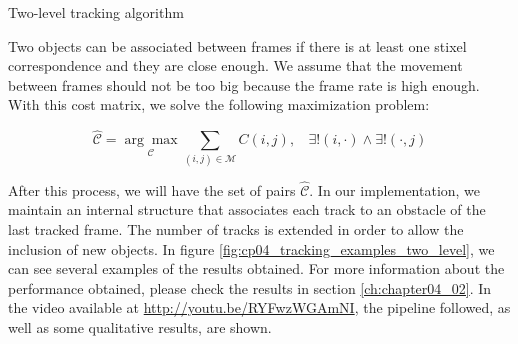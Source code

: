 \begin{algorithm}
\caption{Two-level tracking algorithm}
\label{alg:cp04_two_level_tracking}
\begin{algorithmic}
      \EndIf
    \EndFor
  \EndFor
\EndFunction
\end{algorithmic}
\end{algorithm}

Two objects can be associated between frames if there is at least one stixel correspondence and they are close enough. We assume that the movement between frames should not be too big because the frame rate is high enough. With this cost matrix, we solve the following maximization problem:

\begin{equation}\label{eq:cp04_two_level_maximization}
\mathcal{\hat{C}}=\underset{\mathcal{C}}{\arg\max} \underset{(i, j) \in \mathcal{M}}{\sum} C(i,j),
~~~~\exists! (i, \cdot) \wedge \exists! (\cdot, j)
\end{equation}

After this process, we will have the set of pairs $\mathcal{\hat{C}}$. In our implementation, we maintain an internal structure that associates each track to an obstacle of the last tracked frame. The number of tracks is extended in order to allow the inclusion of new objects. In figure \ref{fig:cp04_tracking_examples_two_level}, we can see several examples of the results obtained. For more information about the performance obtained, please check the results in section \ref{ch:chapter04_02}. In the video available at \url{http://youtu.be/RYFwzWGAmNI}, the pipeline followed, as well as some qualitative results, are shown.

